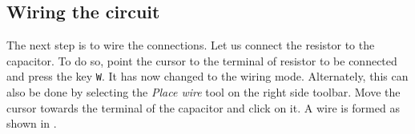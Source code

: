 \subsection{Wiring the circuit}
The next step is to wire the connections. Let us connect the resistor
to the capacitor. To do so, point the cursor to the terminal of
resistor to be connected and press the key {\tt W}. It has now
changed to the wiring mode. Alternately, this can also be done by selecting the \textit{Place wire} tool on the right side toolbar. Move the cursor towards the terminal of
the capacitor and click on it. A wire is formed as shown in
. 
\begin{figure}[h]
\centering
{} \hfill
{}
\end{figure}
